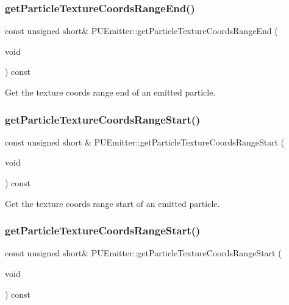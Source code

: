 \subsubsection{\texorpdfstring{get\+Particle\+Texture\+Coords\+Range\+End()}{getParticleTextureCoordsRangeEnd()}\hspace{0.1cm}{\footnotesize\ttfamily [2/2]}}
{\footnotesize\ttfamily const unsigned short\& P\+U\+Emitter\+::get\+Particle\+Texture\+Coords\+Range\+End (\begin{DoxyParamCaption}\item[{void}]{ }\end{DoxyParamCaption}) const}

Get the texture coords range end of an emitted particle. \mbox{\label{classPUEmitter_aa70c8f3a46679009d4ce4dc2cee74cd0}} 
\subsubsection{\texorpdfstring{get\+Particle\+Texture\+Coords\+Range\+Start()}{getParticleTextureCoordsRangeStart()}\hspace{0.1cm}{\footnotesize\ttfamily [1/2]}}
{\footnotesize\ttfamily const unsigned short \& P\+U\+Emitter\+::get\+Particle\+Texture\+Coords\+Range\+Start (\begin{DoxyParamCaption}\item[{void}]{ }\end{DoxyParamCaption}) const}

Get the texture coords range start of an emitted particle. \mbox{\label{classPUEmitter_adc3c964789b1972f9488d8aef6cf860d}} 
\subsubsection{\texorpdfstring{get\+Particle\+Texture\+Coords\+Range\+Start()}{getParticleTextureCoordsRangeStart()}\hspace{0.1cm}{\footnotesize\ttfamily [2/2]}}
{\footnotesize\ttfamily const unsigned short\& P\+U\+Emitter\+::get\+Particle\+Texture\+Coords\+Range\+Start (\begin{DoxyParamCaption}\item[{void}]{ }\end{DoxyParamCaption}) const}

